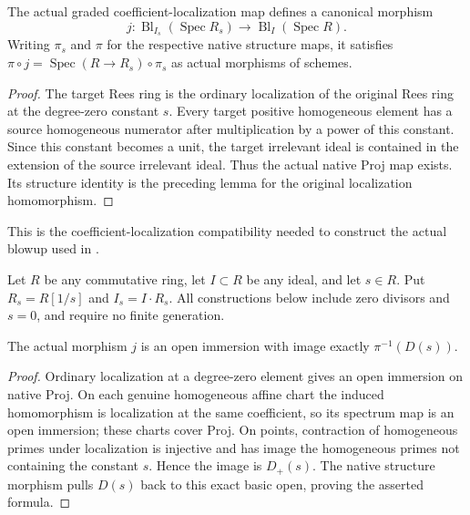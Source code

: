 \begin{definition}\label{def:affine-blowup-localization-map}
\leanok
The actual graded coefficient-localization map defines a canonical morphism
\[j:\operatorname{Bl}_{I_s}(\operatorname{Spec}R_s)
 \longrightarrow\operatorname{Bl}_I(\operatorname{Spec}R).\]
Writing $\pi_s$ and $\pi$ for the respective native structure maps, it
satisfies $\pi\circ j=\operatorname{Spec}(R\to R_s)\circ\pi_s$
as actual morphisms of schemes.
\end{definition}
\begin{proof}
The target Rees ring is the ordinary localization of the original Rees
ring at the degree-zero constant $s$. Every target positive homogeneous
element has a source homogeneous numerator after multiplication by a power
of this constant. Since this constant becomes a unit, the target irrelevant
ideal is contained in the extension of the source irrelevant ideal.
Thus the actual native Proj map exists. Its structure identity is the
preceding lemma for the original localization homomorphism.
\end{proof}

\endgroup

\begingroup

This is the coefficient-localization compatibility needed to construct the
actual blowup used in \cite[4.8]{deJong}.

Let $R$ be any commutative ring, let $I\subset R$ be any ideal, and let
$s\in R$. Put $R_s=R[1/s]$ and $I_s=I\cdot R_s$. All constructions below
include zero divisors and $s=0$, and require no finite generation.

\begin{theorem}\label{thm:affine-blowup-localization-open}
\leanok
The actual morphism $j$ is an open immersion with image exactly
$\pi^{-1}(D(s))$.
\end{theorem}
\begin{proof}
Ordinary localization at a degree-zero element gives an open immersion
on native Proj. On each genuine homogeneous affine chart the induced
homomorphism is localization at the same coefficient, so its spectrum
map is an open immersion; these charts cover Proj. On points, contraction
of homogeneous primes under localization is injective and has image the
homogeneous primes not containing the constant $s$. Hence the image is
$D_+(s)$. The native structure morphism pulls $D(s)$ back to this exact
basic open, proving the asserted formula.
\end{proof}

